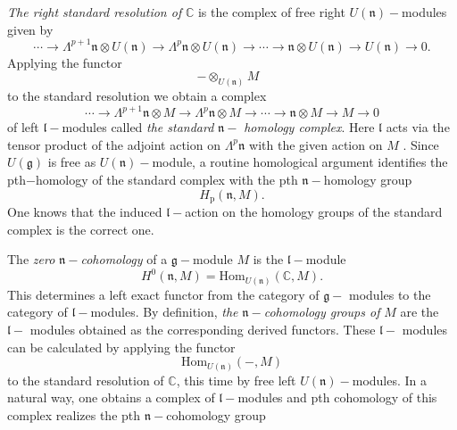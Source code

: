 \noindent \emph{The right standard resolution of }$\mathbb{C}$ is the
complex of free right $U(\mathfrak{n})-$modules given by
\begin{equation*}
\cdots \rightarrow \Lambda ^{p+1}\mathfrak{n}\otimes U(\mathfrak{n}%
)\rightarrow \Lambda ^{p}\mathfrak{n}\otimes U(\mathfrak{n})\rightarrow
\cdots \rightarrow \mathfrak{n}\otimes U(\mathfrak{n})\rightarrow U(%
\mathfrak{n})\rightarrow 0\text{.}
\end{equation*}%
Applying the functor
\begin{equation*}
-\otimes _{U(\mathfrak{n})}M\text{ }
\end{equation*}%
to the standard resolution we obtain a complex
\begin{equation*}
\cdots \rightarrow \Lambda ^{p+1}\mathfrak{n}\otimes M\rightarrow \Lambda
^{p}\mathfrak{n}\otimes M\rightarrow \cdots \rightarrow \mathfrak{n}\otimes
M\rightarrow M\rightarrow 0
\end{equation*}%
of left $\mathfrak{l}-$modules called \emph{the standard} $\mathfrak{n}-$%
\emph{homology complex}. Here $\mathfrak{l}$ acts via the tensor product of
the adjoint action on $\Lambda ^{p}\mathfrak{n}$ with the given action on $M$%
. Since $U(\mathfrak{g})$ is free as $U(\mathfrak{n})-$module, a routine
homological argument identifies the pth$-$homology of the standard complex
with the pth $\mathfrak{n}-$homology group
\begin{equation*}
H_{\text{p}}(\mathfrak{n},M).
\end{equation*}%
One knows that the induced $\mathfrak{l}-$action on the homology groups of
the standard complex is the correct one.

\smallskip

\noindent The \emph{zero} $\mathfrak{n}-$\emph{cohomology }of a $\mathfrak{g}%
-$module $M$ is the $\mathfrak{l}-$module
\begin{equation*}
H^{0}(\mathfrak{n},M)=\text{Hom}_{U(\mathfrak{n})}(\mathbb{C},M).
\end{equation*}%
This determines a left exact functor from the category of $\mathfrak{g}-$%
modules to the category of $\mathfrak{l}-$modules. By definition, \emph{the}
$\mathfrak{n}-$\emph{cohomology groups of} $M$ are the $\mathfrak{l}-$%
modules obtained as the corresponding derived functors. These $\mathfrak{l}-$%
modules can be calculated by applying the functor
\begin{equation*}
\text{Hom}_{U(\mathfrak{n})}(-,M)
\end{equation*}%
to the standard resolution of $\mathbb{C}$, this time by free left $U(%
\mathfrak{n})-$modules. In a natural way, one obtains a complex of $%
\mathfrak{l}-$modules and pth cohomology of this complex realizes the pth $%
\mathfrak{n}-$cohomology group

